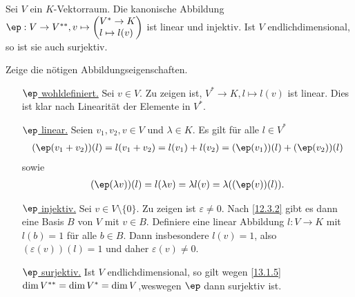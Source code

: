 \documentclass[../../main.tex]{subfiles}
\begin{document}
\begin{pro}\label{13.1.14}
	Sei $V$ ein $K$-Vektorraum. Die kanonische Abbildung $\ep : V\to \ddual V, v\mapsto\begin{pmatrix*}[l]V^*\to K\\ l\mapsto l(v)\end{pmatrix*}$ ist linear und injektiv. Ist $V$ endlichdimensional, so ist sie auch surjektiv.
\end{pro}
\begin{cproof}
	Zeige die nötigen Abbildungseigenschaften.
	\begin{itemize}
		\item[\underline{$\ep$ wohldefiniert.}] Sei $v\in V$. Zu zeigen ist, $V^*\to K, l\mapsto l(v)$ ist linear. Dies ist klar nach Linearität der Elemente in $V^*$.
		\item[\underline{$\ep$ linear.}] Seien $v_1,v_2,v\in V$ und $\lambda\in K$. Es gilt für alle $l\in V^*$
		\begin{align*}
			(\ep(v_1+v_2))(l)=l(v_1+v_2)=l(v_1)+l(v_2)=(\ep(v_1))(l)+(\ep(v_2))(l)
		\end{align*}
		sowie
		\begin{align*}
			(\ep(\lambda v))(l)=l(\lambda v)=\lambda l(v)=\lambda((\ep(v))(l)).
		\end{align*}
		\item[\underline{$\ep$ injektiv.}] Sei $v\in V\setminus\{0\}$. Zu zeigen ist $\varepsilon\neq 0$. Nach \ref{12.3.2} gibt es dann 	eine Basis $B$ von $V$ mit $v\in B$. Definiere eine linear Abbildung $l: V\to K$ mit $l(b)=1$ für alle $b\in B$. Dann insbesondere $l(v)=1$, also $(\varepsilon(v))(l)=1$ und daher $\varepsilon(v)\neq 0$.
		\item[\underline{$\ep$ surjektiv.}] Ist $V$ endlichdimensional, so gilt wegen \eqref{13.1.5} $\dim V^{**}=\dim V^*=\dim V$,weswegen $\ep$ dann surjektiv ist.
	\end{itemize}
\end{cproof}
\end{document}
